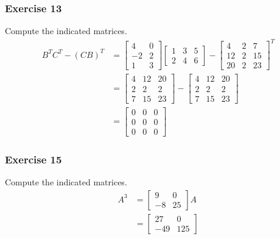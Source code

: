 \documentclass[letterpaper, 12pt]{math}
\begin{document}
\subsubsection*{Exercise 13}
Compute the indicated matrices.
\begin{align*}
  B^TC^T-(CB)^T &= \begin{bmatrix}
    4 & 0 \\
    -2 & 2 \\
    1 & 3
  \end{bmatrix}\begin{bmatrix}
    1 & 3 & 5 \\
    2 & 4 & 6
  \end{bmatrix}-\begin{bmatrix}
    4 & 2 & 7 \\
    12 & 2 & 15 \\
    20 & 2 & 23
  \end{bmatrix}^T \\
  &= \begin{bmatrix}
    4 & 12 & 20 \\
    2 & 2 & 2 \\
    7 & 15 & 23
  \end{bmatrix}-\begin{bmatrix}
    4 & 12 & 20 \\
    2 & 2 & 2 \\
    7 & 15 & 23
  \end{bmatrix} \\
  &= \begin{bmatrix}
    0 & 0 & 0 \\
    0 & 0 & 0 \\
    0 & 0 & 0
  \end{bmatrix}
\end{align*}

\subsubsection*{Exercise 15}
Compute the indicated matrices.
\begin{align*}
  A^3 &= \begin{bmatrix}
    9 & 0 \\
    -8 & 25
  \end{bmatrix}A \\
  &= \begin{bmatrix}
    27 & 0 \\
    -49 & 125
  \end{bmatrix}
\end{align*}
\end{document}
